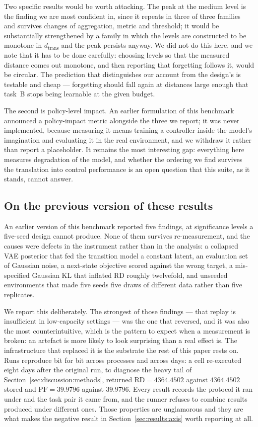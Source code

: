 Two specific results would be worth attacking. The peak at the medium level is
the finding we are most confident in, since it repeats in three of three families
and survives changes of aggregation, metric and threshold; it would be
substantially strengthened by a family in which the levels are constructed to be
monotone in $d_{\mathrm{trans}}$ and the peak persists anyway. We did not do this
here, and we note that it has to be done carefully: choosing levels so that the
measured distance comes out monotone, and then reporting that forgetting follows
it, would be circular. The prediction that distinguishes our account from the
design's is testable and cheap --- forgetting should fall again at distances large
enough that task~B stops being learnable at the given budget.

The second is policy-level impact. An earlier formulation of this benchmark
announced a policy-impact metric alongside the three we report; it was never
implemented, because measuring it means training a controller inside the model's
imagination and evaluating it in the real environment, and we withdraw it rather
than report a placeholder. It remains the most interesting gap: everything here
measures degradation of the model, and whether the ordering we find survives the
translation into control performance is an open question that this suite, as it
stands, cannot answer.

\subsection{On the previous version of these results}
\label{sec:discussion:previous}

An earlier version of this benchmark reported five findings, at significance
levels a five-seed design cannot produce. None of them survives re-measurement,
and the causes were defects in the instrument rather than in the analysis: a
collapsed VAE posterior that fed the transition model a constant latent, an
evaluation set of Gaussian noise, a next-state objective scored against the wrong
target, a mis-specified Gaussian KL that inflated RD roughly twelvefold, and
unseeded environments that made five seeds five draws of different data rather
than five replicates.

We report this deliberately. The strongest of those findings --- that replay is
insufficient in low-capacity settings --- was the one that reversed, and it was
also the most counterintuitive, which is the pattern to expect when a measurement
is broken: an artefact is more likely to look surprising than a real effect is.
The infrastructure that replaced it is the substrate the rest of this paper rests
on. Runs reproduce bit for bit across processes and across days: a cell
re-executed eight days after the original run, to diagnose the heavy tail of
Section~\ref{sec:discussion:methods}, returned $\text{RD} = 4364.4502$ against
$4364.4502$ stored and $\text{PF} = 39.9796$ against $39.9796$. Every result
records the protocol it ran under and the task pair it came from, and the runner
refuses to combine results produced under different ones. Those properties are
unglamorous and they are what makes the negative result in
Section~\ref{sec:results:axis} worth reporting at all.
